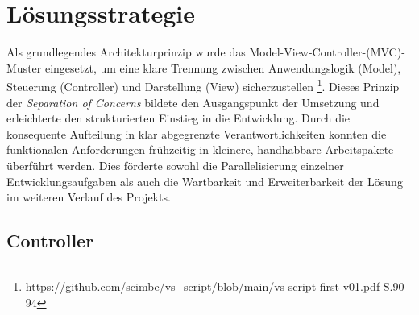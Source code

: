 \chapter{Lösungsstrategie}
Als grundlegendes Architekturprinzip wurde das Model-View-Controller-(MVC)-Muster eingesetzt, um eine klare Trennung zwischen Anwendungslogik (Model), Steuerung (Controller) und Darstellung (View) sicherzustellen
\footnote{\url{https://github.com/scimbe/vs_script/blob/main/vs-script-first-v01.pdf} S.90-94}. 
Dieses Prinzip der \textit{Separation of Concerns} bildete den Ausgangspunkt der Umsetzung und erleichterte den strukturierten Einstieg in die Entwicklung. 
Durch die konsequente Aufteilung in klar abgegrenzte Verantwortlichkeiten konnten die funktionalen Anforderungen frühzeitig in kleinere, handhabbare Arbeitspakete überführt werden. 
Dies förderte sowohl die Parallelisierung einzelner Entwicklungsaufgaben als auch die Wartbarkeit und Erweiterbarkeit der Lösung im weiteren Verlauf des Projekts.



\clearpage
\section{Controller}

